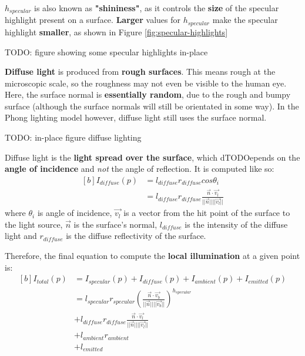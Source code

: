 \documentclass{article}
\begin{document}
$h_{specular}$ is also known as \textbf{"shininess"}, as it controls the \textbf{size} of the specular highlight present on a surface. \textbf{Larger} values for $h_{specular}$ make the specular highlight \textbf{smaller}, as shown in Figure \ref{fig:specular-highlights}

TODO: figure showing some specular highlights in-place

\textbf{Diffuse light} is produced from \textbf{rough surfaces}. This means rough at the microscopic scale, so the roughness may not even be visible to the human eye. Here, the surface normal is \textbf{essentially random}, due to the rough and bumpy surface (although the surface normals will still be orientated in some way). In the Phong lighting model however, diffuse light still uses the surface normal. 

TODO: in-place figure diffuse lighting

Diffuse light is the \textbf{light spread over the surface}, which dTODOepends on the \textbf{angle of incidence} and \textit{not} the angle of reflection. It is computed like so:
\begin{equation}
\begin{aligned}[b]
	I_{diffuse}(p) &= l_{diffuse} r_{diffuse} cos \theta_i \\
	&= l_{diffuse} r_{diffuse} \frac{\vec{n} \cdot \vec{v_l}}{||\vec{n}||||\vec{v_l}||}
\end{aligned}
\end{equation}
where $\theta_i$ is angle of incidence, $\vec{v_l}$ is a vector from the hit point of the surface to the light source, $\vec{n}$ is the surface's normal, $l_{diffuse}$ is the intensity of the diffuse light and $r_{diffuse}$ is the diffuse reflectivity of the surface.

Therefore, the final equation to compute the \textbf{local illumination} at a given point is:
\begin{equation}
\begin{aligned}[b]
	I_{total}(p) &= I_{specular}(p) + I_{diffuse}(p) + I_{ambient}(p) + I_{emitted}(p) \\
	&= l_{specular} r_{specular} \left( 
	\frac{\vec{n} \cdot \vec{v_b}}{||\vec{n}||||\vec{v_b}||}
	\right)^{h_{specular}} \\
	&+ l_{diffuse} r_{diffuse} \frac{\vec{n} \cdot \vec{v_l}}{||\vec{n}||||\vec{v_l}||} \\
	&+ l_{ambient} r_{ambient} \\
	&+ l_{emitted} \\
\end{aligned}
\label{eq:phong-lighting-model-full}
\end{equation}
\end{document}
